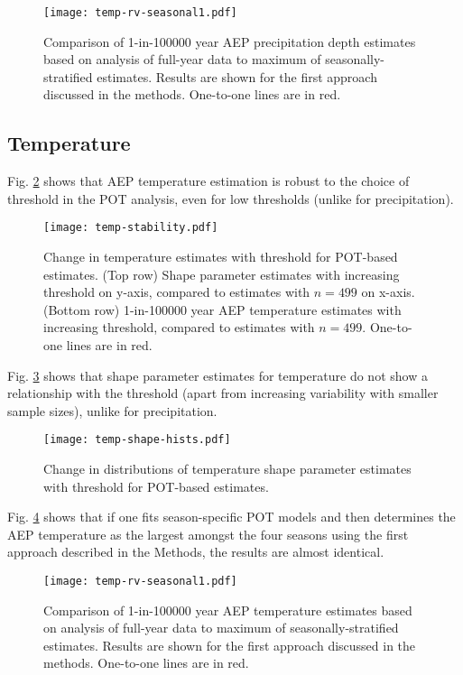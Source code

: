 \documentclass{ametsocV6.1}
\begin{document}
\begin{figure}[H]
    \centering
    \texttt{[image: temp-rv-seasonal1.pdf]}
    \caption{Comparison of 1-in-100000 year AEP precipitation depth estimates based on analysis of full-year data to maximum of seasonally-stratified estimates. Results are shown for the first approach discussed in the methods. One-to-one lines are in red.}
    \label{fig:prec-rv-seasonal1}
\end{figure}

\subsection*{Temperature}

Fig. \ref{fig:temp-stability} shows that AEP temperature estimation is robust to the choice of threshold in the POT analysis, even for low thresholds (unlike for precipitation).

\begin{figure}[H]
    \centering
    \texttt{[image: temp-stability.pdf]}
    \caption{Change in temperature estimates with threshold for POT-based estimates. (Top row) Shape parameter estimates with increasing threshold on y-axis, compared to estimates with $n=499$ on x-axis. (Bottom row) 1-in-100000 year AEP temperature estimates with increasing threshold, compared to estimates with $n=499$. One-to-one lines are in red.}
    \label{fig:temp-stability}
\end{figure}

Fig. \ref{fig:temp-shape-hists} shows that shape parameter estimates for temperature do not show a relationship with the threshold (apart from increasing variability with smaller sample sizes), unlike for precipitation.

\begin{figure}[H]
    \centering
    \texttt{[image: temp-shape-hists.pdf]}
    \caption{Change in distributions of temperature shape parameter estimates with threshold for POT-based estimates.}
    \label{fig:temp-shape-hists}
\end{figure}

Fig. \ref{fig:temp-rv-seasonal1} shows that if one fits season-specific POT models and then determines the AEP temperature as the largest amongst the four seasons using the first approach described in the Methods, the results are almost identical.

\begin{figure}[H]
    \centering
    \texttt{[image: temp-rv-seasonal1.pdf]}
    \caption{Comparison of 1-in-100000 year AEP temperature estimates based on analysis of full-year data to maximum of seasonally-stratified estimates. Results are shown for the first approach discussed in the methods. One-to-one lines are in red.}
    \label{fig:temp-rv-seasonal1}
\end{figure}

\end{document}
